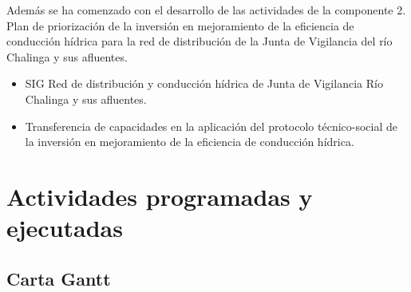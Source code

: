 \documentclass[]{article}
\begin{document}
Además se ha comenzado con el desarrollo de las actividades de la componente 2. Plan de priorización de la inversión en mejoramiento de la eficiencia de conducción hídrica para la red de distribución de la Junta de Vigilancia del río Chalinga y sus afluentes.

\begin{itemize}
\item SIG Red de distribución y conducción hídrica de Junta de Vigilancia Río Chalinga y sus afluentes.
\item Transferencia de capacidades en la aplicación del protocolo técnico-social de la inversión en mejoramiento de la eficiencia de conducción hídrica.
\end{itemize}

\clearpage
\section{Actividades programadas y ejecutadas}

\subsection{Carta Gantt}
\end{document}
